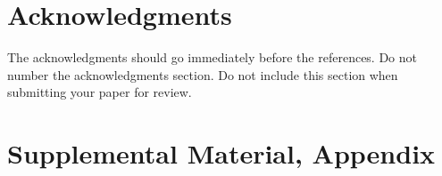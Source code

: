 \documentclass[11pt]{article}
\begin{document}
\section*{Acknowledgments}
\label{sec:acknowledgments}

The acknowledgments should go immediately before the references.  Do
not number the acknowledgments section. Do not include this section
when submitting your paper for review.

%
%



\appendix

\section{Supplemental Material, Appendix}
\label{sec:supplemental}
\end{document}
